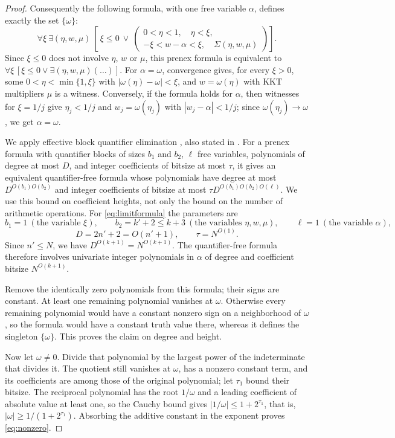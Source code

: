 \begin{proof}
Consequently the following formula, with one free variable $\alpha$,
defines exactly the set $\{\omega\}$:
\begin{equation}\label{eq:limitformula}
 \forall\xi\ \exists(\eta,w,\mu)\ \left[\ \xi\le0\ \lor\
   \left(
   \begin{array}{l}
    0<\eta<1,\quad\eta<\xi,\\
    -\xi<w-\alpha<\xi,\quad\Sigma(\eta,w,\mu)
   \end{array}\right)\right].
\end{equation}
Since $\xi\le0$ does not involve $\eta$, $w$ or $\mu$, this prenex
formula is equivalent to
$\forall\xi\,[\xi\le0\lor\exists(\eta,w,\mu)(\ldots)]$. For
$\alpha=\omega$, convergence gives, for every $\xi>0$, some
$0<\eta<\min\{1,\xi\}$ with $|\omega(\eta)-\omega|<\xi$, and
$w=\omega(\eta)$ with KKT multipliers $\mu$ is a witness. Conversely, if
the formula holds for $\alpha$, then witnesses for $\xi=1/j$ give
$\eta_j<1/j$ and $w_j=\omega(\eta_j)$ with $|w_j-\alpha|<1/j$; since
$\omega(\eta_j)\to\omega$, we get $\alpha=\omega$.

We apply effective block quantifier elimination
\citep[Theorem~14.16]{BasuPollackRoy2006}, also stated in
\citet[Theorem~2.27]{Basu2014}. For a prenex formula with quantifier
blocks of sizes $b_1$ and $b_2$, $\ell$ free variables, polynomials of
degree at most $D$, and integer coefficients of bitsize at most $\tau$, it
gives an equivalent quantifier-free formula whose polynomials have degree
at most $D^{O(b_1)O(b_2)}$ and integer coefficients of bitsize at most
$\tau D^{O(b_1)O(b_2)O(\ell)}$. We use this bound on coefficient heights,
not only the bound on the number of arithmetic operations. For
\eqref{eq:limitformula} the parameters are
\[
 b_1=1\ (\text{the variable }\xi),\qquad
 b_2=k'+2\le k+3\ (\text{the variables }\eta,w,\mu),\qquad
 \ell=1\ (\text{the variable }\alpha),
\]
\[
 D=2n'+2=O(n'+1),\qquad \tau=N^{O(1)}.
\]
Since $n'\le N$, we have $D^{O(k+1)}=N^{O(k+1)}$. The quantifier-free
formula therefore involves univariate integer polynomials in $\alpha$ of
degree and coefficient bitsize $N^{O(k+1)}$.

Remove the identically zero polynomials from this formula; their signs
are constant. At least one remaining polynomial vanishes at $\omega$.
Otherwise every remaining polynomial would have a constant nonzero sign on
a neighborhood of $\omega$, so the formula would have a constant truth
value there, whereas it defines the singleton $\{\omega\}$. This proves
the claim on degree and height.

Now let $\omega\ne0$. Divide that polynomial by the largest power of the
indeterminate that divides it. The quotient still vanishes at $\omega$,
has a nonzero constant term, and its coefficients are among those of the
original polynomial; let $\tau_1$ bound their bitsize. The reciprocal
polynomial has the root $1/\omega$ and a leading coefficient of absolute
value at least one, so the Cauchy bound gives
$|1/\omega|\le1+2^{\tau_1}$, that is, $|\omega|\ge1/(1+2^{\tau_1})$.
Absorbing the additive constant in the exponent proves \eqref{eq:nonzero}.
\end{proof}

